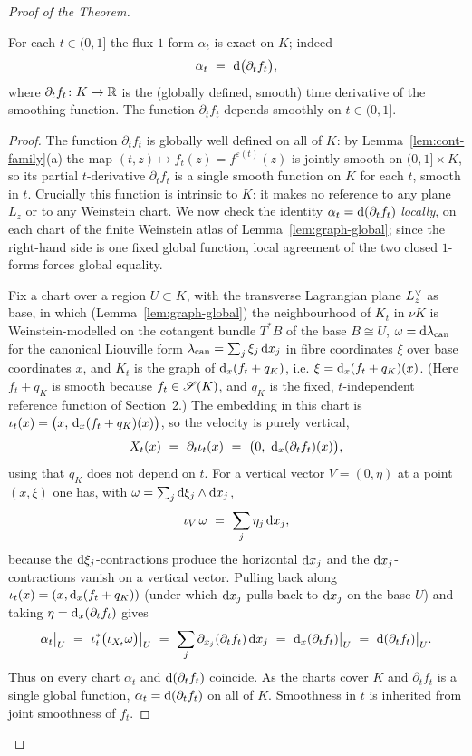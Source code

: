 \begin{proof}[Proof of the Theorem]
\begin{qeightlemma}\label{lem:flux-exact}
For each $t\in(0,1]$ the flux $1$-form $\alpha_t$ is exact on $K$; indeed
\[
\alpha_t\ =\ \qeightdd\bigl(\partial_t f_t\bigr),
\]
where $\partial_t f_t\colon K\to\mathbb{R}$ is the (globally defined, smooth) time
derivative of the smoothing function. The function $\partial_t f_t$ depends smoothly
on $t\in(0,1]$.
\end{qeightlemma}

\begin{proof}
The function $\partial_t f_t$ is globally well defined on all of $K$: by
Lemma~\ref{lem:cont-family}(a) the map $(t,z)\mapsto f_t(z)=f^{\varepsilon(t)}(z)$
is jointly smooth on $(0,1]\times K$, so its partial $t$-derivative
$\partial_t f_t$ is a single smooth function on $K$ for each $t$, smooth in $t$.
Crucially this function is intrinsic to $K$: it makes no reference to any plane
$L_z$ or to any Weinstein chart. We now check the identity $\alpha_t=\mathrm d(\partial_t f_t)$
\emph{locally}, on each chart of the finite Weinstein atlas of
Lemma~\ref{lem:graph-global}; since the right-hand side is one fixed global function,
local agreement of the two closed $1$-forms forces global equality.

Fix a chart over a region $U\subset K$, with the transverse Lagrangian plane
$L^{\vee}_z$ as base, in which (Lemma~\ref{lem:graph-global}) the neighbourhood of
$K_t$ in $\nu K$ is Weinstein-modelled on the cotangent bundle $T^{*}B$ of the base
$B\cong U$, $\omega=\mathrm d\lambda_{\mathrm{can}}$ for the canonical Liouville form
$\lambda_{\mathrm{can}}=\sum_j \xi_j\,\mathrm d x_j$ in fibre coordinates $\xi$ over base
coordinates $x$, and $K_t$ is the graph of $\mathrm d_x(f_t+q_K)$, i.e.
$\xi=\mathrm d_x(f_t+q_K)(x)$. (Here $f_t+q_K$ is smooth because $f_t\in\mathscr S(K)$, and
$q_K$ is the fixed, $t$-independent reference function of Section~2.) The embedding
in this chart is $\iota_t(x)=\bigl(x,\,\mathrm d_x(f_t+q_K)(x)\bigr)$, so the velocity
is purely vertical,
\[
X_t(x)\ =\ \partial_t\iota_t(x)\ =\ \bigl(0,\ \qeightdd_x(\partial_t f_t)(x)\bigr),
\]
using that $q_K$ does not depend on $t$. For a vertical vector
$V=(0,\eta)$ at a point $(x,\xi)$ one has, with
$\omega=\sum_j \mathrm d\xi_j\wedge\mathrm d x_j$,
\[
\iota_{V}\,\omega\ =\ \sum_j \eta_j\,\mathrm d x_j ,
\]
because the $\mathrm d\xi_j$-contractions produce the horizontal $\mathrm d x_j$ and the
$\mathrm d x_j$-contractions vanish on a vertical vector. Pulling back along
$\iota_t(x)=(x,\mathrm d_x(f_t+q_K))$ (under which $\mathrm d x_j$ pulls back to $\mathrm d x_j$ on
the base $U$) and taking $\eta=\mathrm d_x(\partial_t f_t)$ gives
\[
\alpha_t\big|_U\ =\ \iota_t^{*}\bigl(\iota_{X_t}\omega\bigr)\big|_U
\ =\ \sum_j \partial_{x_j}(\partial_t f_t)\,\qeightdd x_j
\ =\ \qeightdd_x(\partial_t f_t)\big|_U
\ =\ \qeightdd(\partial_t f_t)\big|_U .
\]
Thus on every chart $\alpha_t$ and $\mathrm d(\partial_t f_t)$ coincide. As the charts
cover $K$ and $\partial_t f_t$ is a single global function, $\alpha_t=\mathrm d(\partial_t f_t)$
on all of $K$. Smoothness in $t$ is inherited from joint smoothness of $f_t$.
\end{proof}


\end{proof}
